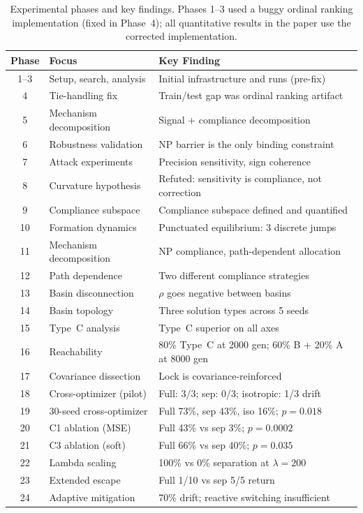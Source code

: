 \documentclass[twoside]{article}
\begin{document}
\begin{table}[t]
\caption{Experimental phases and key findings. Phases 1--3 used a buggy ordinal
ranking implementation (fixed in Phase~4); all quantitative results in the paper
use the corrected implementation.}
\label{tab:timeline}
\centering
\small
\begin{tabular}{clp{7cm}}
\toprule
Phase & Focus & Key Finding \\
\midrule
1--3 & Setup, search, analysis & Initial infrastructure and runs (pre-fix) \\
4 & Tie-handling fix & Train/test gap was ordinal ranking artifact \\
5 & Mechanism decomposition & Signal + compliance decomposition \\
6 & Robustness validation & NP barrier is the only binding constraint \\
7 & Attack experiments & Precision sensitivity, sign coherence \\
8 & Curvature hypothesis & Refuted: sensitivity is compliance, not correction \\
9 & Compliance subspace & Compliance subspace defined and quantified \\
10 & Formation dynamics & Punctuated equilibrium: 3 discrete jumps \\
11 & Mechanism decomposition & NP compliance, path-dependent allocation \\
12 & Path dependence & Two different compliance strategies \\
13 & Basin disconnection & $\rho$ goes negative between basins \\
14 & Basin topology & Three solution types across 5 seeds \\
15 & Type~C analysis & Type~C superior on all axes \\
16 & Reachability & 80\% Type~C at 2000 gen; 60\% B + 20\% A at 8000 gen \\
17 & Covariance dissection & Lock is covariance-reinforced \\
18 & Cross-optimizer (pilot) & Full: 3/3; sep: 0/3; isotropic: 1/3 drift \\
19 & 30-seed cross-optimizer & Full 73\%, sep 43\%, iso 16\%; $p = 0.018$ \\
20 & C1 ablation (MSE) & Full 43\% vs sep 3\%; $p = 0.0002$ \\
21 & C3 ablation (soft) & Full 66\% vs sep 40\%; $p = 0.035$ \\
22 & Lambda scaling & 100\% vs 0\% separation at $\lambda = 200$ \\
23 & Extended escape & Full 1/10 vs sep 5/5 return \\
24 & Adaptive mitigation & 70\% drift; reactive switching insufficient \\
\bottomrule
\end{tabular}
\end{table}
\end{document}
